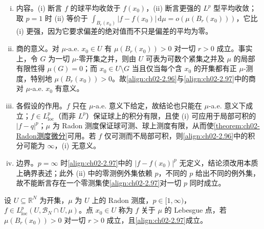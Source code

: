 \documentclass[../../main.tex]{subfiles}%
\begin{document}
\begin{remark}\label{remark:ch02-Lebesgue点}
\begin{enumerate}[(i)]
\item 内容。(i) 断言 $f$ 的球平均收敛于 $f(x_0)$，(ii) 断言更强的 $L^p$ 型平均收敛；取 $p=1$ 时 (ii) 等价于 $\int_{B_r(x_0)}|f-f(x_0)|\,\mathrm{d}\mu=o(\mu(B_r(x_0)))$，它比 (i) 更强，因为它要求偏差的绝对值而不只是偏差的平均为零。
\item 商的意义。对 $\mu$-a.e. $x_0\in U$ 有 $\mu(B_r(x_0))>0$ 对一切 $r>0$ 成立。事实上，令 $G$ 为一切 $\mu$-零开集之并，则由 $U$ 可表为可数个紧集之并及 $\mu$ 的局部有限性得 $\mu(G)=0$；而 $x_0\in U\setminus G$ 当且仅当每个含 $x_0$ 的开集都有正 $\mu$-测度，特别地 $\mu(B_r(x_0))>0$。故\eqref{align:ch02-2.96}与\eqref{align:ch02-2.97}中的商对 $\mu$-a.e. $x_0$ 有意义。
\item 各假设的作用。$f$ 只在 $\mu$-a.e. 意义下给定，故结论也只能在 $\mu$-a.e. 意义下成立；$f\in L^p_{\mathrm{loc}}$（而非 $L^p$）保证球上的积分有限，且使 (i) 可应用于局部可积的 $|f-q|^p$；$\mu$ 为 Radon 测度保证球可测、球上测度有限，从而使\cref{theorem:ch02-Radon测度微分}可用。若 $f$ 仅可测而不局部可积，则\eqref{align:ch02-2.96}中的积分可能为 $\infty$，(i) 无意义。
\item 边界。$p=\infty$ 时\eqref{align:ch02-2.97}中的 $|f-f(x_0)|^p$ 无定义，结论须改用本质上确界表述；此外 (ii) 中的零测例外集依赖 $p$，不同的 $p$ 给出不同的例外集，故不能断言存在一个零测集使\eqref{align:ch02-2.97}对一切 $p$ 同时成立。
\end{enumerate}
\end{remark}

\begin{definition}\label{definition:ch02-Lebesgue点}
设 $U\subseteq\mathbb R^N$ 为开集，$\mu$ 为 $U$ 上的 Radon 测度，$p\in[1,\infty)$，$f\in L^p_{\mathrm{loc}}(U,\mathscr B_N\cap U,\mu)$。点 $x_0\in U$ 称为 $f$ 关于 $\mu$ 的 Lebesgue 点，若 $\mu(B_r(x_0))>0$ 对一切 $r>0$ 成立，且\eqref{align:ch02-2.97}成立。
\end{definition}
\end{document}
